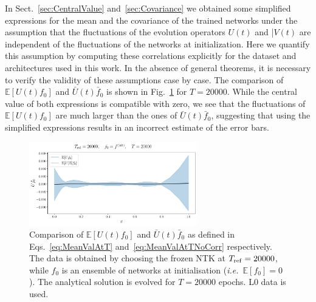 


In Sect.~\ref{sec:CentralValue} and~\ref{sec:Covariance} we obtained some simplified expressions 
for the mean and the covariance of the trained networks under the assumption that the fluctuations
of the evolution operators $U(t)$ and |$V(t)$ are independent of the fluctuations of the networks 
at initialization. Here we quantify this assumption by computing these correlations explicitly 
for the dataset and architectures used in this work. In the absence of general theorems, it is necessary 
to verify the validity of these assumptions case by case. The comparison of 
$\mathbb{E}\left[U(t) f_{0}\right]$ and $\bar{U}(t) \bar{f}_{0}$ is shown in Fig.~\ref{fig:xT3_exp_val} for
$T=20000$. 
While the central value of both expressions is compatible with zero, we see that the fluctuations of 
$\mathbb{E}\left[U(t) f_{0}\right]$ are much larger than the ones of $\bar{U}(t) \bar{f}_{0}$, suggesting 
that using the simplified expressions results in an incorrect estimate of the error bars. 

\begin{figure}[t!]
  \centering
  \includegraphics[width=0.65\textwidth]{plots/u_v_studies/u_f0_independence_20000_L0.pdf}
  \caption{Comparison of $\mathbb{E}\left[U(t) f_{0}\right]$ and $\bar{U}(t) \bar{f}_{0}$ as defined in 
    Eqs.~\eqref{eq:MeanValAtT} and~\eqref{eq:MeanValAtTNoCorr} respectively. 
    The data is obtained by choosing the frozen NTK at $T_{\rm
    ref} = 20000$, while $f_0$ is an ensemble of networks at initialisation
    (\textit{i.e.}\ $\mathbb{E}[f_0]=0$). The analytical solution is evolved for
    $T=20000$ epochs. L0 data is used.}
    \label{fig:xT3_exp_val}
  \end{figure}
